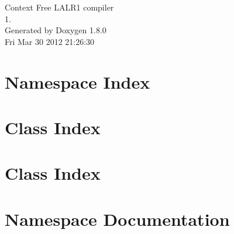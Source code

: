 \documentclass{book}
\begin{document}
\hypersetup{pageanchor=false,citecolor=blue}
\begin{titlepage}
\vspace*{7cm}
\begin{center}
{\Large Context Free L\-A\-L\-R1 compiler \\[1ex]\large 1. }\\
\vspace*{1cm}
{\large Generated by Doxygen 1.8.0}\\
\vspace*{0.5cm}
{\small Fri Mar 30 2012 21:26:30}\\
\end{center}
\end{titlepage}
\clearemptydoublepage
{}
\tableofcontents
\clearemptydoublepage
{}
\hypersetup{pageanchor=true,citecolor=blue}
\chapter{Namespace Index}

\chapter{Class Index}

\chapter{Class Index}

\chapter{Namespace Documentation}




\end{document}
